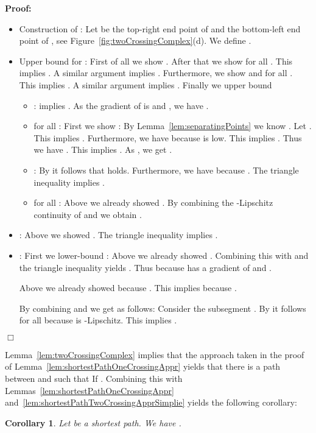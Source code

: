 \documentclass[a4paper,11pt]{article}
\newtheorem{corollary}{Corollary}
\newenvironment{proof}{\textbf{Proof:}}{\hspace*{0mm}\hfill\ensuremath{\Box}}
\begin{document}
\begin{proof}
	\begin{itemize} 
		\item Construction of : Let  be the top-right end point of  and  the bottom-left end point of , see Figure~\ref{fig:twoCrossingComplex}(d). We define . 
		\item Upper bound for : First of all we show . After that we show  for all . This implies . A similar argument implies . Furthermore, we show  and  for all . This implies . A similar argument implies  . Finally we upper bound
			 
			\begin{itemize}
				\item :  implies . As the gradient of  is  and , we have .
				\item  for all : First we show : By Lemma~\ref{lem:separatingPoints} we know . Let . This implies . Furthermore, we have  because  is low. This implies . Thus we have . This implies . As , we get .
				\item : By  it follows that  holds. Furthermore, we have  because . The triangle inequality implies .
				\item  for all : Above we already showed . By combining the -Lipschitz continuity of  and  we obtain .
			\end{itemize}
		\item : Above we showed . The triangle inequality implies .
		\item : First we lower-bound : Above we already showed . Combining this with  and the triangle inequality yields . Thus  because  has a gradient of  and . 
		
	Above we already showed  because . This implies  because .
		
	By combining  and  we get  as follows: Consider the subsegment . By  it follows  for all  because  is -Lipschitz. This implies . 
	\end{itemize}
\end{proof}


	Lemma~\ref{lem:twoCrossingComplex} implies that the  approach taken in the proof of Lemma~\ref{lem:shortestPathOneCrossingAppr} yields that there is a path  between  and  such that  If . Combining this with Lemmas~\ref{lem:shortestPathOneCrossingAppr} and~\ref{lem:shortestPathTwoCrossingApprSimplie} yields the following corollary:

\begin{corollary}\label{cor:apprC2}
	Let  be a shortest path. We have .
\end{corollary}
\end{document}
